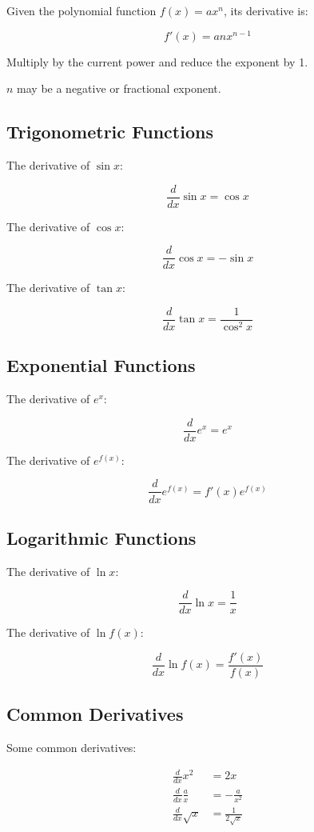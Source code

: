 \documentclass[a4paper,11pt]{article}
\begin{document}
Given the polynomial function $f(x) = ax^n$, its derivative is:

$$
f'(x) = anx^{n - 1}
$$

Multiply by the current power and reduce the exponent by 1.

$n$ may be a negative or fractional exponent.


\subsection{Trigonometric Functions}

The derivative of $\sin{x}$:

$$
\frac{d}{dx} \sin{x} = \cos{x}
$$

The derivative of $\cos{x}$:

$$
\frac{d}{dx} \cos{x} = -\sin{x}
$$

The derivative of $\tan{x}$:

$$
\frac{d}{dx} \tan{x} = \frac{1}{\cos^2{x}}
$$



\subsection{Exponential Functions}

The derivative of $e^x$:

$$
\frac{d}{dx} e^x = e^x
$$

The derivative of $e^{f(x)}$:

$$
\frac{d}{dx} e^{f(x)} = f'(x)e^{f(x)}
$$


\subsection{Logarithmic Functions}

The derivative of $\ln{x}$:

$$
\frac{d}{dx} \ln{x} = \frac{1}{x}
$$

The derivative of $\ln{f(x)}$:

$$
\frac{d}{dx} \ln{f(x)} = \frac{f'(x)}{f(x)}
$$


\subsection{Common Derivatives}

Some common derivatives:

$$
\begin{aligned}
\frac{d}{dx} x^2 & = 2x \\
\frac{d}{dx} \frac{a}{x} & = -\frac{a}{x^2} \\
\frac{d}{dx} \sqrt{x} & = \frac{1}{2\sqrt{x}} \\
\end{aligned}
$$
\end{document}
